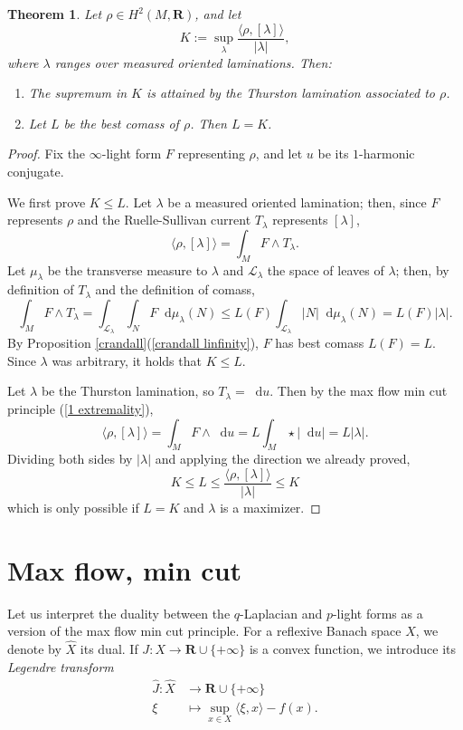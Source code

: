 \documentclass[reqno,11pt]{amsart}
\newcommand{\RR}{\mathbf{R}}
\newcommand*\dif{\mathop{}\!\mathrm{d}}
\newcommand{\dfn}[1]{\emph{#1}\index{#1}}
\newtheorem{theorem}{Theorem}[section]
\theoremstyle{definition}
\numberwithin{equation}{section}
\begin{document}
\begin{theorem}\label{L equals K}
	Let $\rho \in H^2(M, \RR)$, and let 
	$$K := \sup_\lambda \frac{\langle \rho, [\lambda]\rangle}{|\lambda|},$$
	where $\lambda$ ranges over measured oriented laminations. Then:
\begin{enumerate}
	\item The supremum in $K$ is attained by the Thurston lamination associated to $\rho$.
	\item Let $L$ be the best comass of $\rho$. Then $L = K$.
\end{enumerate}
\end{theorem}
\begin{proof}
Fix the $\infty$-light form $F$ representing $\rho$, and let $u$ be its $1$-harmonic conjugate.

We first prove $K \leq L$.
Let $\lambda$ be a measured oriented lamination; then, since $F$ represents $\rho$ and the Ruelle-Sullivan current $T_\lambda$ represents $[\lambda]$,
$$\langle \rho, [\lambda]\rangle = \int_M F \wedge T_\lambda.$$
Let $\mu_\lambda$ be the transverse measure to $\lambda$ and $\mathscr L_\lambda$ the space of leaves of $\lambda$; then, by definition of $T_\lambda$ and the definition of comass,
$$\int_M F \wedge T_\lambda = \int_{\mathscr L_\lambda} \int_N F \dif \mu_\lambda(N) \leq L(F) \int_{\mathscr L_\lambda} |N| \dif \mu_\lambda(N) = L(F) |\lambda|.$$
By Proposition \ref{crandall}(\ref{crandall linfinity}), $F$ has best comass $L(F) = L$.
Since $\lambda$ was arbitrary, it holds that $K \leq L$.

Let $\lambda$ be the Thurston lamination, so $T_\lambda = \dif u$.
Then by the max flow min cut principle (\ref{1 extremality}),
$$\langle \rho, [\lambda]\rangle = \int_M F \wedge \dif u = L \int_M \star |\dif u| = L|\lambda|.$$
Dividing both sides by $|\lambda|$ and applying the direction we already proved,
$$K \leq L \leq \frac{\langle \rho, [\lambda]\rangle}{|\lambda|} \leq K$$
which is only possible if $L = K$ and $\lambda$ is a maximizer.
\end{proof}

\appendix 
\section{Max flow, min cut}\label{Max Flow Min Cut}
Let us interpret the duality between the $q$-Laplacian and $p$-light forms as a version of the max flow min cut principle. 
For a reflexive Banach space $X$, we denote by $\hat X$ its dual.
If $J: X \to \RR \cup \{+\infty\}$ is a convex function, we introduce its \dfn{Legendre transform}
\begin{align*}
	\hat J: \hat X &\to \RR \cup \{+\infty\}\\
	\xi &\mapsto \sup_{x \in X} \langle \xi, x\rangle - f(x).
\end{align*}
\end{document}
